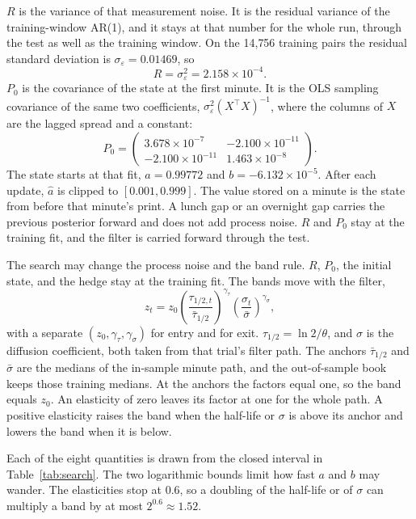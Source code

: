 \documentclass[11pt]{article}
\begin{document}
$R$ is the variance of that measurement noise. It is the residual variance of the training-window AR(1), and it stays at that number for the whole run, through the test as well as the training window. On the 14{,}756 training pairs the residual standard deviation is $\sigma_\varepsilon = 0.01469$, so
\[
R = \sigma_\varepsilon^2 = 2.158\times 10^{-4}.
\]
$P_0$ is the covariance of the state at the first minute. It is the OLS sampling covariance of the same two coefficients, $\sigma_\varepsilon^2 (X^{\top} X)^{-1}$, where the columns of $X$ are the lagged spread and a constant:
\[
P_0 =
\begin{pmatrix}
3.678\times 10^{-7} & -2.100\times 10^{-11} \\
-2.100\times 10^{-11} & 1.463\times 10^{-8}
\end{pmatrix}.
\]
The state starts at that fit, $a = 0.99772$ and $b = -6.132\times 10^{-5}$. After each update, $\hat a$ is clipped to $[0.001, 0.999]$. The value stored on a minute is the state from before that minute's print. A lunch gap or an overnight gap carries the previous posterior forward and does not add process noise. $R$ and $P_0$ stay at the training fit, and the filter is carried forward through the test.

The search may change the process noise and the band rule. $R$, $P_0$, the initial state, and the hedge stay at the training fit. The bands move with the filter,
\begin{equation}
z_t = z_0
\left(\frac{\tau_{1/2,t}}{\bar\tau_{1/2}}\right)^{\gamma_\tau}
\left(\frac{\sigma_t}{\bar\sigma}\right)^{\gamma_\sigma},
\end{equation}
with a separate $(z_0, \gamma_\tau, \gamma_\sigma)$ for entry and for exit. $\tau_{1/2} = \ln 2 / \theta$, and $\sigma$ is the diffusion coefficient, both taken from that trial's filter path. The anchors $\bar\tau_{1/2}$ and $\bar\sigma$ are the medians of the in-sample minute path, and the out-of-sample book keeps those training medians. At the anchors the factors equal one, so the band equals $z_0$. An elasticity of zero leaves its factor at one for the whole path. A positive elasticity raises the band when the half-life or $\sigma$ is above its anchor and lowers the band when it is below.

Each of the eight quantities is drawn from the closed interval in Table~\ref{tab:search}. The two logarithmic bounds limit how fast $a$ and $b$ may wander. The elasticities stop at 0.6, so a doubling of the half-life or of $\sigma$ can multiply a band by at most $2^{0.6} \approx 1.52$.
\end{document}
